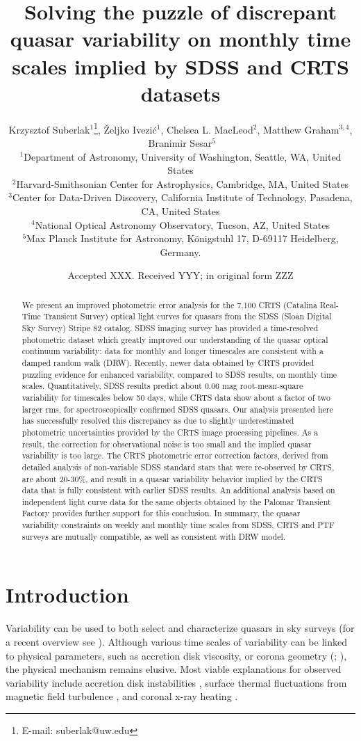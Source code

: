 \documentclass[fleqn,usenatbib]{mnras}  %
\title[Quasar Variability]{Solving the puzzle of discrepant quasar variability on monthly time scales implied by SDSS and CRTS datasets}
\author[K. Suberlak et al.]{
Krzysztof Suberlak$^{1}$\thanks{E-mail: suberlak@uw.edu},
\v{Z}eljko Ivezi\'c$^{1}$,
Chelsea L. MacLeod$^{2}$,
Matthew Graham$^{3,4}$, 
\newauthor
$\, \,  $Branimir Sesar$^{5}$
\\
$^{1}$Department of Astronomy, University of Washington, Seattle, WA, United States\\
$^{2}$Harvard-Smithsonian Center for Astrophysics, Cambridge, MA, United States\\
$^{3}$Center for Data-Driven Discovery, California Institute of Technology, Pasadena, CA, United States\\
$^{4}$National Optical Astronomy Observatory, Tucson, AZ, United States\\
$^{5}$Max Planck Institute for Astronomy, K\"{o}nigstuhl 17, D-69117 Heidelberg, Germany. 
}
\date{Accepted XXX. Received YYY; in original form ZZZ}
\begin{document}
\label{firstpage}
\pagerange{\pageref{firstpage}--\pageref{lastpage}}
\maketitle

\begin{abstract}
We present an improved photometric error analysis for the 7,100 CRTS (Catalina Real-Time Transient Survey) 
optical  light curves for quasars from the SDSS (Sloan Digital Sky Survey) Stripe 82 catalog. SDSS imaging survey 
has provided a time-resolved photometric  dataset which greatly improved our understanding of the quasar 
optical continuum variability: data for monthly and longer timescales  are consistent with a damped random walk (DRW).
Recently, newer data  obtained by CRTS provided  puzzling evidence for enhanced variability, compared to SDSS 
results, on monthly time scales. Quantitatively, SDSS results predict  about 0.06 mag root-mean-square variability 
for timescales below 50 days, while CRTS data show about a factor of two larger rms, for spectroscopically confirmed 
SDSS quasars. Our analysis presented here has successfully resolved this discrepancy as due to slightly underestimated 
photometric uncertainties provided by the CRTS image processing pipelines. As a result, the correction for observational 
noise is too small and the implied quasar variability is too large. The CRTS photometric error correction factors, derived 
from detailed analysis of non-variable SDSS standard stars that were re-observed by CRTS, are about 20-30\%, and 
result in a quasar variability behavior implied by the CRTS data that is fully consistent with earlier SDSS results. An 
additional analysis based on independent light curve data for the same objects obtained by the Palomar Transient Factory 
provides further support for this conclusion. In summary, the quasar variability constraints on weekly and monthly time
scales from SDSS, CRTS and PTF surveys are mutually compatible, as well as consistent with DRW model. 
\end{abstract}




\section{Introduction}
Variability can be used to both select and characterize quasars in sky surveys (for a recent overview see \citealt{lawrence2016a}). Although various time scales of variability can be linked to physical parameters, such as accretion disk viscosity, or corona geometry (\citealt{kelly2011}; \citealt{graham2014}), the physical mechanism remains elusive. Most viable explanations for observed
variability include accretion disk instabilities \citep{kawaguchi1998}, surface thermal fluctuations from magnetic field turbulence \citep{kelly2009}, and
coronal x-ray heating \citep[][see \citealt{kozlowski2016} for a review]{kelly2011}.
\end{document}
